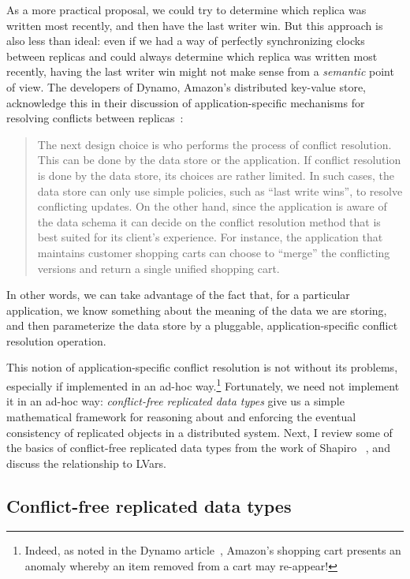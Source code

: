\documentclass{article}
\begin{document}
As a more practical proposal, we could try to determine which replica
was written most recently, and then have the last writer win.  But
this approach is also less than ideal: even if we had a way of
perfectly synchronizing clocks between replicas and could always
determine which replica was written most recently, having the last
writer win might not make sense from a \emph{semantic} point of view.
The developers of Dynamo, Amazon's distributed key-value store,
acknowledge this in their discussion of application-specific
mechanisms for resolving conflicts between replicas~\cite{dynamo}:
\begin{quote}
  The next design choice is who performs the process of conflict
  resolution. This can be done by the data store or the
  application. If conflict resolution is done by the data store, its
  choices are rather limited. In such cases, the data store can only
  use simple policies, such as ``last write wins'', to resolve
  conflicting updates. On the other hand, since the application is
  aware of the data schema it can decide on the conflict resolution
  method that is best suited for its client’s experience. For
  instance, the application that maintains customer shopping carts can
  choose to ``merge'' the conflicting versions and return a single
  unified shopping cart.
\end{quote}
In other words, we can take advantage of the fact that, for a
particular application, we know something about the meaning of the
data we are storing, and then parameterize the data store by a
pluggable, application-specific conflict resolution operation.

This notion of application-specific conflict resolution is not without
its problems, especially if implemented in an ad-hoc
way.\footnote{Indeed, as noted in the Dynamo article~\cite{dynamo},
  Amazon's shopping cart presents an anomaly whereby an item removed
  from a cart may re-appear!}  Fortunately, we need not implement it
in an ad-hoc way: \emph{conflict-free replicated data types} give us a
simple mathematical framework for reasoning about and enforcing the
eventual consistency of replicated objects in a distributed system.
Next, I review some of the basics of conflict-free replicated data
types from the work of Shapiro \etal~\cite{crdts, crdts-tr}, and
discuss the relationship to LVars.

\subsection{Conflict-free replicated data types}
\end{document}
